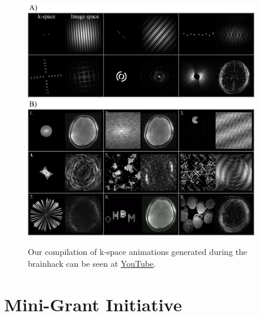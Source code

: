 \documentclass{article}
\begin{document}
\begin{figure}[hbt!]
    \centering
    \includegraphics[width=0.9\textwidth]{images/k-particles.png}
    \label{fig:kparticles}
    \caption{
        Our compilation of k-space animations generated during the brainhack can be seen at \href{https://youtu.be/XS0LEQExGU8?si=I5Zufp3AcCbdhYIR}{YouTube}.
    }
\end{figure}



\section{Mini-Grant Initiative}
\end{document}
